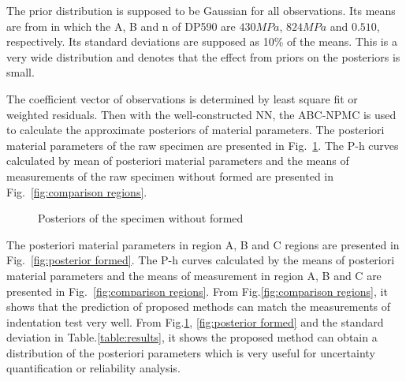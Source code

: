 \documentclass[review]{elsarticle}
\begin{document}
The prior distribution is supposed to be Gaussian for all observations. Its means are from \cite{vedantam2006johnson} in which the A, B and n of DP590 are $430MPa$, $824MPa$ and $0.510$, respectively. Its standard deviations are supposed as 10\% of the means. This is a very wide distribution and denotes that the effect from priors on the posteriors is small.

The coefficient vector of observations is determined by least square fit or weighted residuals. Then with the well-constructed NN, the ABC-NPMC is used to calculate the approximate posteriors of material parameters. The posteriori material parameters of the raw specimen are presented in Fig.~\ref{fig:posterior DP}. The P-h curves calculated by mean of posteriori material parameters and the means of measurements of the raw specimen without formed are presented in Fig.~\ref{fig:comparison regions}.

\begin{figure}[h!]
\centering
{}
\caption{Posteriors of the specimen without formed}
\label{fig:posterior DP}
\end{figure}

The posteriori material parameters in region A, B and C regions are presented in Fig.~\ref{fig:posterior formed}. The P-h curves calculated by the means of posteriori material parameters and the means of measurement in region A, B and C are presented in Fig.~\ref{fig:comparison regions}. From Fig.\ref{fig:comparison regions}, it shows that the prediction of proposed methods can match the measurements of indentation test very well. From  Fig.\ref{fig:posterior DP}, \ref{fig:posterior formed} and the standard deviation in Table.\ref{table:results}, it shows the proposed method can obtain a distribution of the posteriori parameters which is very useful for uncertainty quantification or reliability analysis.
\end{document}

